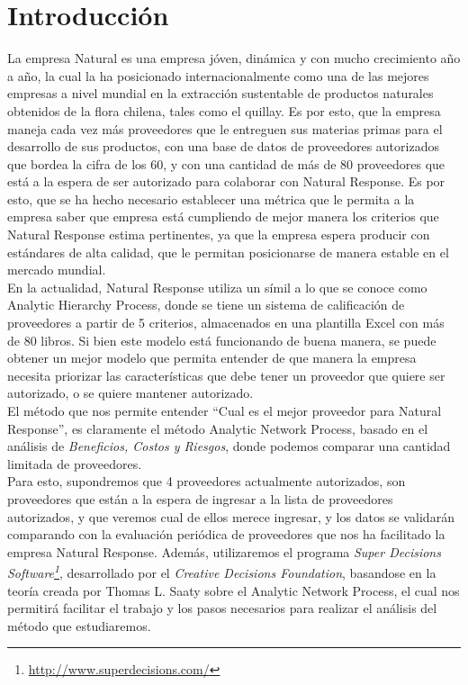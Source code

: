 \documentclass[12pt,twocolumn]{article}
\begin{document}
\section{Introducción}
La empresa Natural es una empresa jóven, dinámica y con mucho crecimiento año a año, la cual la ha posicionado internacionalmente como una de las mejores empresas a nivel mundial en la extracción sustentable de productos naturales obtenidos de la flora chilena, tales como el quillay. Es por esto, que la empresa maneja cada vez más proveedores que le entreguen sus materias primas para el desarrollo de sus productos, con una base de datos de proveedores autorizados que bordea la cifra de los 60, y con una cantidad de más de 80 proveedores que está a la espera de ser autorizado para colaborar con Natural Response. Es por esto, que se ha hecho necesario establecer una métrica que le permita a la empresa saber que empresa está cumpliendo de mejor manera los criterios que Natural Response estima pertinentes, ya que la empresa espera producir con estándares de alta calidad, que le permitan posicionarse de manera estable en el mercado mundial.\\

En la actualidad, Natural Response utiliza un símil a lo que se conoce como Analytic Hierarchy Process, donde se tiene un sistema de calificación de proveedores a partir de 5 criterios, almacenados en una plantilla Excel con más de 80 libros. Si bien este modelo está funcionando de buena manera, se puede obtener un mejor modelo que permita entender de que manera la empresa necesita priorizar las características que debe tener un proveedor que quiere ser autorizado, o se quiere mantener autorizado.\\

El método que nos permite entender ``Cual es el mejor proveedor para Natural Response'', es claramente el método Analytic Network Process, basado en el análisis de \textit{Beneficios, Costos y Riesgos}, donde podemos comparar una cantidad limitada de proveedores.\\
Para esto, supondremos que 4 proveedores actualmente autorizados, son proveedores que están a la espera de ingresar a la lista de proveedores autorizados, y que veremos cual de ellos merece ingresar, y los datos se validarán comparando con la evaluación periódica de proveedores que nos ha facilitado la empresa Natural Response. Además, utilizaremos el programa \textit{Super Decisions Software\footnote{\url{http://www.superdecisions.com/}}}, desarrollado por el \textit{Creative Decisions Foundation}, basandose en la teoría creada por Thomas L. Saaty sobre el Analytic Network Process, el cual nos permitirá facilitar el trabajo y los pasos necesarios para realizar el análisis del método que estudiaremos.
\newpage
\end{document}
